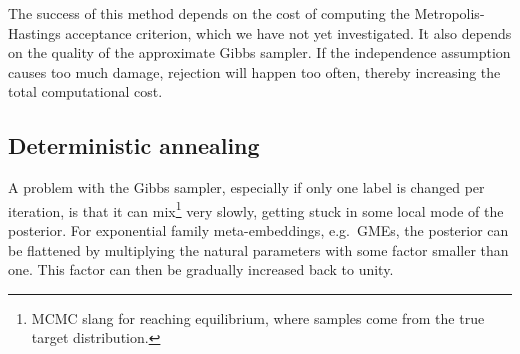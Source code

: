 \documentclass[a4paper,oneside,12pt,english]{report}
\begin{document}
The success of this method depends on the cost of computing the Metropolis-Hastings acceptance criterion, which we have not yet investigated. It also depends on the quality of the approximate Gibbs sampler. If the independence assumption causes too much damage, rejection will happen too often, thereby increasing the total computational cost. 



\subsection{Deterministic annealing}
A problem with the Gibbs sampler, especially if only one label is changed per iteration, is that it can mix\footnote{MCMC slang for reaching equilibrium, where samples come from the true target distribution.} very slowly, getting stuck in some local mode of the posterior. For exponential family meta-embeddings, e.g.\ GMEs, the posterior can be flattened by multiplying the natural parameters with some factor smaller than one. This factor can then be gradually increased back to unity.
\end{document}
